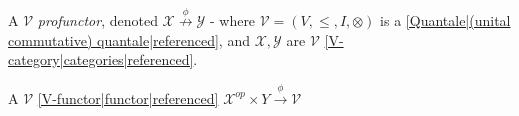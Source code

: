 
A $\mathcal{V}$ \emph{profunctor}, denoted $\mathcal{X}\overset{\phi}{\nrightarrow} \mathcal{Y}$
    - where $\mathcal{V}=(V,\leq,I,\otimes)$ is a \ref{Quantale|(unital commutative) quantale|referenced}, and $\mathcal{X},\mathcal{Y}$ are $\mathcal{V}$ \ref{V-category|categories|referenced}.

A $\mathcal{V}$ \ref{V-functor|functor|referenced} $\mathcal{X}^{op}\times Y \xrightarrow{\phi} \mathcal{V}$
